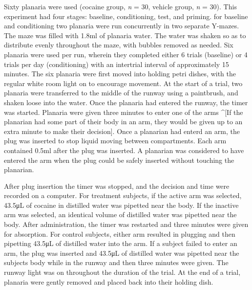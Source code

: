 \documentclass[
  letterpaper,
  DIV=11,
  numbers=noendperiod,
  oneside]{scrartcl}
\begin{document}
Sixty planaria were used (cocaine group, \emph{n} = 30, vehicle group,
\emph{n} = 30). This experiment had four stages: baseline, conditioning,
test, and priming. for baseline and conditioning two planaria were run
concurrently in two separate Y-mazes. The maze was filled with 1.8ml of
planaria water. The water was shaken so as to distribute evenly
throughout the maze, with bubbles removed as needed. Six planaria were
used per run, wherein they completed either 6 trials (baseline) or 4
trials per day (conditioning) with an intertrial interval of
approximately 15 minutes. The six planaria were first moved into holding
petri dishes, with the regular white room light on to encourage
movement. At the start of a trial, two planaria were transferred to the
middle of the runway using a paintbrush, and shaken loose into the
water. Once the planaria had entered the runway, the timer was started.
Planaria were given three minutes to enter one of the arms \^{}{[}If the
planarian had some part of their body in an arm, they would be given up
to an extra minute to make their decision{]}. Once a planarian had
enterd an arm, the plug was inserted to stop liquid moving between
compartments. Each arm contained 0.5ml after the plug was inserted. A
planarian was considered to have entered the arm when the plug could be
safely inserted without touching the planarian.

After plug insertion the timer was stopped, and the decision and time
were recorded on a computer. For treatment subjects, if the active arm
was selected, 43.5μL of cocaine in distilled water was pipetted near the
body. If the inactive arm was selected, an identical volume of distilled
water was pipetted near the body. After administration, the timer was
restarted and three minutes were given for absorption. For control
subjects, either arm resulted in plugging and then pipetting 43.5μL of
distilled water into the arm. If a subject failed to enter an arm, the
plug was inserted and 43.5μL of distilled water was pipetted near the
subjects body while in the runway and then three minutes were given. The
runway light was on throughout the duration of the trial. At the end of
a trial, planaria were gently removed and placed back into their holding
dish.
\end{document}
